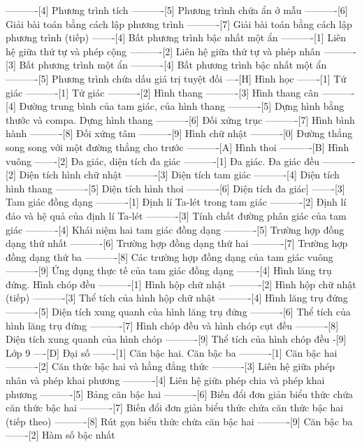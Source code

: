 ----------[4] Phương trình tích
----------[5] Phương trình chứa ẩn ở mẫu
----------[6] Giải bài toán bằng cách lập phương trình
----------[7] Giải bài toán bằng cách lập phương trình (tiếp)
-------[4] Bất phương trình bậc nhất một ẩn
----------[1] Liên hệ giữa thứ tự và phép cộng
----------[2] Liên hệ giữa thứ tự và phép nhân
----------[3] Bất phương trình một ẩn
----------[4] Bất phương trình bậc nhất một ẩn
----------[5] Phương trình chứa dấu giá trị tuyệt đối
----[H] Hình học
-------[1] Tứ giác
----------[1] Tứ giác
----------[2] Hình thang
----------[3] Hình thang cân
----------[4] Đường trung bình của tam giác, của hình thang
----------[5] Dựng hình bằng thước và compa. Dựng hình thang
----------[6] Đối xứng trục
----------[7] Hình bình hành
----------[8] Đối xứng tâm
----------[9] Hình chữ nhật
----------[0] Đường thẳng song song với một đường thẳng cho trước
----------[A] Hình thoi
----------[B] Hình vuông
-------[2] Đa giác, diện tích đa giác
----------[1] Đa giác. Đa giác đều
----------[2] Diện tích hình chữ nhật
----------[3] Diện tích tam giác
----------[4] Diện tích hình thang
----------[5] Diện tích hình thoi
----------[6] Diện tích đa giác]
-------[3] Tam giác đồng dạng
----------[1] Định lí Ta-lét trong tam giác
----------[2] Định lí đảo và hệ quả của định lí Ta-lét
----------[3] Tính chất đường phân giác của tam giác
----------[4] Khái niệm hai tam giác đồng dạng
----------[5] Trường hợp đồng dạng thứ nhất
----------[6] Trường hợp đồng dạng thứ hai
----------[7] Trường hợp đồng dạng thứ ba
----------[8] Các trường hợp đồng dạng của tam giác vuông
----------[9] Ứng dụng thực tế của tam giác đồng dạng
-------[4] Hình lăng trụ đứng. Hình chóp đều
----------[1] Hình hộp chữ nhật
----------[2] Hình hộp chữ nhật (tiếp)
----------[3] Thể tích của hình hộp chữ nhật
----------[4] Hình lăng trụ đứng
----------[5] Diện tích xung quanh của hình lăng trụ đứng
----------[6] Thể tích của hình lăng trụ đứng
----------[7] Hình chóp đều và hình chóp cụt đều
----------[8] Diện tích xung quanh của hình chóp
----------[9] Thể tích của hình chóp đều
-[9] Lớp 9
----[D] Đại số
-------[1] Căn bậc hai. Căn bậc ba
----------[1] Căn bậc hai
----------[2] Căn thức bậc hai và hằng đẳng thức
----------[3] Liên hệ giữa phép nhân và phép khai phương
----------[4] Liên hệ giữa phép chia và phép khai phương
----------[5] Bảng căn bậc hai
----------[6] Biến đổi đơn giản biểu thức chứa căn thức bậc hai
----------[7] Biến đổi đơn giản biểu thức chứa căn thức bậc hai (tiếp theo)
----------[8] Rút gọn biểu thức chứa căn bậc hai
----------[9] Căn bậc ba
-------[2] Hàm số bậc nhất
